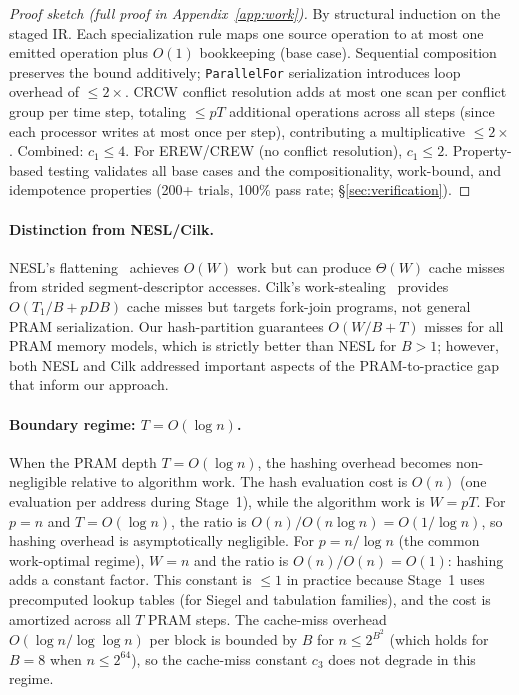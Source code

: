 \documentclass[11pt]{article}
\begin{document}
\begin{proof}[Proof sketch (full proof in Appendix~\ref{app:work})]
By structural induction on the staged IR\@.  Each specialization rule maps
one source operation to at most one emitted operation plus $O(1)$
bookkeeping (base case).  Sequential composition preserves the bound
additively; \texttt{ParallelFor} serialization introduces loop overhead
of $\le 2\times$.  CRCW conflict resolution adds at most one scan per
conflict group per time step, totaling $\le pT$ additional operations
across all steps (since each processor writes at most once per step),
contributing a multiplicative $\le 2\times$.  Combined: $c_1 \le 4$.
For EREW/CREW (no conflict resolution), $c_1 \le 2$.
Property-based testing validates all base cases and the compositionality,
work-bound, and idempotence properties (200+ trials, 100\% pass rate;
\S\ref{sec:verification}).
\end{proof}

\paragraph{Distinction from NESL/Cilk.}
NESL's flattening~\cite{blelloch1996programming} achieves $O(W)$ work
but can produce $\Theta(W)$ cache misses from strided segment-descriptor
accesses.  Cilk's work-stealing~\cite{frigo1998implementation} provides
$O(T_1/B + pDB)$ cache misses but targets fork-join programs, not
general PRAM serialization.  Our hash-partition guarantees $O(W/B + T)$
misses for all PRAM memory models, which is strictly better than NESL
for $B > 1$; however, both NESL and Cilk addressed important aspects of
the PRAM-to-practice gap that inform our approach.

\paragraph{Boundary regime: $T = O(\log n)$.}
When the PRAM depth $T = O(\log n)$, the hashing overhead becomes
non-negligible relative to algorithm work.  The hash evaluation cost is
$O(n)$ (one evaluation per address during Stage~1), while the algorithm
work is $W = pT$.  For $p = n$ and $T = O(\log n)$, the ratio is
$O(n) / O(n \log n) = O(1/\log n)$, so hashing overhead is asymptotically
negligible.  For $p = n/\log n$ (the common work-optimal regime),
$W = n$ and the ratio is $O(n)/O(n) = O(1)$: hashing adds a constant
factor.  This constant is $\le 1$ in practice because Stage~1 uses
precomputed lookup tables (for Siegel and tabulation families), and the
cost is amortized across all $T$ PRAM steps.  The cache-miss overhead
$O(\log n / \log\log n)$ per block is bounded by $B$ for $n \le 2^{B^2}$
(which holds for $B = 8$ when $n \le 2^{64}$), so the cache-miss constant
$c_3$ does not degrade in this regime.
\end{document}
